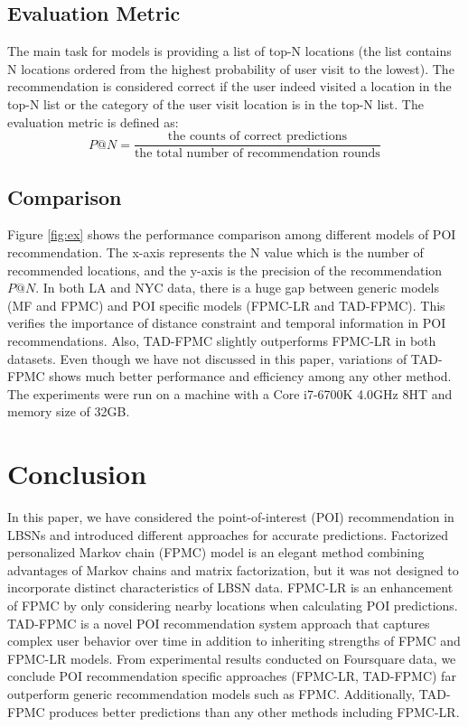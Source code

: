 \documentclass{sig-alternate}
\begin{document}
\subsection{Evaluation Metric}
\label{metic}
The main task for models is providing a list of top-N locations (the list contains N locations 
ordered from the highest probability of user visit to the lowest). The recommendation is considered 
correct if the user indeed visited a location in the top-N list or the category of the user visit location 
is in the top-N list. The evaluation metric is defined as:
\begin{equation}
	P@N = \frac{\textrm{the counts of correct predictions}} {\textrm{the total number of recommendation rounds}}
\label{eq:P@N}
\end{equation}

\subsection{Comparison}
\label{comparison}
Figure \ref{fig:ex} shows the performance comparison among different models of POI recommendation. 
The x-axis represents the N value which is the number of recommended locations, and the y-axis 
is the precision of the recommendation $P@N$. In both LA and NYC data, there is a huge gap 
between generic models (MF and FPMC) and POI specific models (FPMC-LR and TAD-FPMC). 
This verifies the importance of distance constraint and temporal information in POI recommendations. 
Also, TAD-FPMC slightly outperforms FPMC-LR in both datasets. Even though we have not discussed in 
this paper, variations of TAD-FPMC shows much better performance and efficiency among any other method. 
The experiments were run on a machine with a Core i7-6700K 4.0GHz 8HT and memory size of 32GB. \cite{Li:2017} 

\section{Conclusion}
\label{sec:conclusion}

In this paper, we have considered the point-of-interest (POI) recommendation in LBSNs 
and introduced different approaches for accurate predictions. Factorized personalized Markov 
chain (FPMC) model is an elegant method combining advantages of Markov chains and matrix factorization,
but it was not designed to incorporate distinct characteristics of LBSN data. FPMC-LR is an enhancement 
of FPMC by only considering nearby locations when calculating POI predictions. TAD-FPMC is a novel 
POI recommendation system approach that captures complex user behavior over time in addition to inheriting strengths 
of FPMC and FPMC-LR models. From experimental results conducted on Foursquare data, we conclude 
POI recommendation specific approaches (FPMC-LR, TAD-FPMC) far outperform generic recommendation models such as FPMC.
Additionally, TAD-FPMC produces better predictions than any other methods including FPMC-LR.
\end{document}
